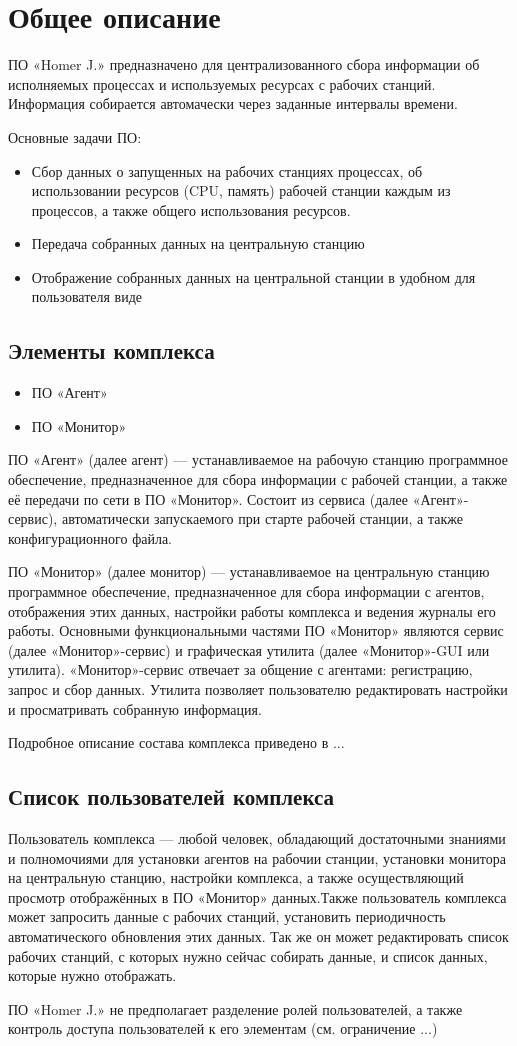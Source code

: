 \section{Общее описание}

ПО «Homer J.» предназначено для централизованного сбора информации об исполняемых процессах и используемых ресурсах с рабочих станций. Информация собирается автомачески через заданные интервалы времени.

Основные задачи ПО:
\begin{itemize}
\item	Сбор данных о запущенных на рабочих станциях процессах, об использовании ресурсов (CPU, память) рабочей станции каждым из процессов, а также общего использования ресурсов. 
\item	Передача собранных данных на центральную станцию
\item	Отображение собранных данных на центральной станции в удобном для пользователя виде
\end{itemize}

\subsection{Элементы комплекса}
\begin{itemize}
\item	ПО «Агент»
\item	ПО «Монитор» 
\end{itemize}

ПО «Агент» (далее агент) --- устанавливаемое на рабочую станцию программное обеспечение, предназначенное для сбора информации с рабочей станции, а также её передачи по сети в ПО «Монитор». Состоит из сервиса (далее «Агент»-сервис), автоматически запускаемого при старте рабочей станции, а также конфигурационного файла. 

ПО «Монитор» (далее монитор) --- устанавливаемое на центральную станцию программное обеспечение, предназначенное для сбора информации с агентов, отображения этих данных, настройки работы комплекса и ведения журналы его работы. Основными функциональными частями ПО «Монитор» являются сервис (далее «Монитор»-сервис) и графическая утилита (далее «Монитор»-GUI или утилита). «Монитор»-сервис отвечает за общение с агентами: регистрацию, запрос и сбор данных. Утилита позволяет пользователю редактировать настройки и просматривать собранную информация.

Подробное описание состава комплекса приведено в ...

\subsection{Список пользователей комплекса}
Пользователь комплекса --- любой человек, обладающий достаточными знаниями и полномочиями для установки агентов на рабочии станции, установки монитора на центральную станцию, настройки комплекса, а также осуществляющий просмотр отображённых в ПО «Монитор» данных.Также пользователь комплекса  может запросить данные с рабочих станций, установить периодичность автоматического обновления этих данных. Так же он может редактировать список рабочих станций, с которых нужно сейчас собирать данные, и список данных, которые нужно отображать.

ПО «Homer J.» не предполагает разделение ролей пользователей, а также контроль доступа пользователей к его элементам (см. ограничение ...)

